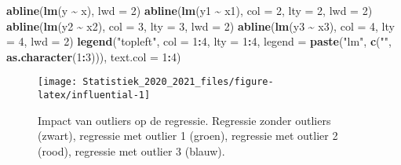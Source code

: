 \documentclass[
  12pt,dutch,coursenotes]{book}
\newenvironment{Shaded}{\begin{snugshade}}{\end{snugshade}}
\newcommand{\DataTypeTok}[1]{\textcolor[rgb]{0.13,0.29,0.53}{#1}}
\newcommand{\DecValTok}[1]{\textcolor[rgb]{0.00,0.00,0.81}{#1}}
\newcommand{\KeywordTok}[1]{\textcolor[rgb]{0.13,0.29,0.53}{\textbf{#1}}}
\newcommand{\NormalTok}[1]{#1}
\newcommand{\OperatorTok}[1]{\textcolor[rgb]{0.81,0.36,0.00}{\textbf{#1}}}
\newcommand{\StringTok}[1]{\textcolor[rgb]{0.31,0.60,0.02}{#1}}
\theoremstyle{definition}
\theoremstyle{definition}
\theoremstyle{definition}
\theoremstyle{remark}
\begin{document}
\begin{Shaded}
\begin{Highlighting}[]
\KeywordTok{abline}\NormalTok{(}\KeywordTok{lm}\NormalTok{(y }\OperatorTok{\textasciitilde{}}\StringTok{ }\NormalTok{x), }\DataTypeTok{lwd =} \DecValTok{2}\NormalTok{)}
\KeywordTok{abline}\NormalTok{(}\KeywordTok{lm}\NormalTok{(y1 }\OperatorTok{\textasciitilde{}}\StringTok{ }\NormalTok{x1), }\DataTypeTok{col =} \DecValTok{2}\NormalTok{, }\DataTypeTok{lty =} \DecValTok{2}\NormalTok{, }\DataTypeTok{lwd =} \DecValTok{2}\NormalTok{)}
\KeywordTok{abline}\NormalTok{(}\KeywordTok{lm}\NormalTok{(y2 }\OperatorTok{\textasciitilde{}}\StringTok{ }\NormalTok{x2), }\DataTypeTok{col =} \DecValTok{3}\NormalTok{, }\DataTypeTok{lty =} \DecValTok{3}\NormalTok{, }\DataTypeTok{lwd =} \DecValTok{2}\NormalTok{)}
\KeywordTok{abline}\NormalTok{(}\KeywordTok{lm}\NormalTok{(y3 }\OperatorTok{\textasciitilde{}}\StringTok{ }\NormalTok{x3), }\DataTypeTok{col =} \DecValTok{4}\NormalTok{, }\DataTypeTok{lty =} \DecValTok{4}\NormalTok{, }\DataTypeTok{lwd =} \DecValTok{2}\NormalTok{)}
\KeywordTok{legend}\NormalTok{(}\StringTok{"topleft"}\NormalTok{, }\DataTypeTok{col =} \DecValTok{1}\OperatorTok{:}\DecValTok{4}\NormalTok{, }\DataTypeTok{lty =} \DecValTok{1}\OperatorTok{:}\DecValTok{4}\NormalTok{, }\DataTypeTok{legend =} \KeywordTok{paste}\NormalTok{(}\StringTok{"lm"}\NormalTok{, }
    \KeywordTok{c}\NormalTok{(}\StringTok{""}\NormalTok{, }\KeywordTok{as.character}\NormalTok{(}\DecValTok{1}\OperatorTok{:}\DecValTok{3}\NormalTok{))), }\DataTypeTok{text.col =} \DecValTok{1}\OperatorTok{:}\DecValTok{4}\NormalTok{)}
\end{Highlighting}
\end{Shaded}

\begin{figure}

{\centering \texttt{[image: Statistiek\_2020\_2021\_files/figure-latex/influential-1]} 

}

\caption{Impact van outliers op de regressie. Regressie zonder outliers (zwart), regressie met outlier 1 (groen), regressie met outlier 2 (rood), regressie met outlier 3 (blauw).}\label{fig:influential}
\end{figure}
\end{document}
